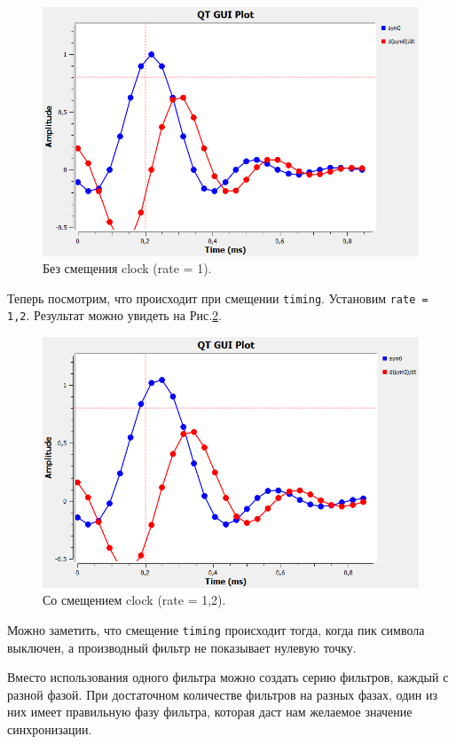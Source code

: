 \documentclass[a4paper, 14pt]{extarticle}
\begin{document}
    \begin{figure}[H]
        \centering
        \includegraphics[width=0.8\linewidth]{resources/Images/task3_without_clock_offset}
        \caption{Без смещения clock (rate = 1).}
        \label{fig:task3_without_clock_offset}
    \end{figure}

    Теперь посмотрим, что происходит при смещении \texttt{timing}. Установим \texttt{rate = 1,2}.
    Результат можно увидеть на Рис.\ref{fig:task3_with_clock_offset}.

    \begin{figure}[H]
        \centering
        \includegraphics[width=0.8\linewidth]{resources/Images/task3_with_clock_offset}
        \caption{Со смещением clock (rate = 1,2).}
        \label{fig:task3_with_clock_offset}
    \end{figure}

    Можно заметить, что смещение \texttt{timing} происходит тогда, когда пик символа выключен,
    а производный фильтр не показывает нулевую точку.


    Вместо использования одного фильтра можно создать серию фильтров, каждый с разной фазой.
    При достаточном количестве фильтров на разных фазах, один из них имеет правильную фазу фильтра,
    которая даст нам желаемое значение синхронизации.
\end{document}
